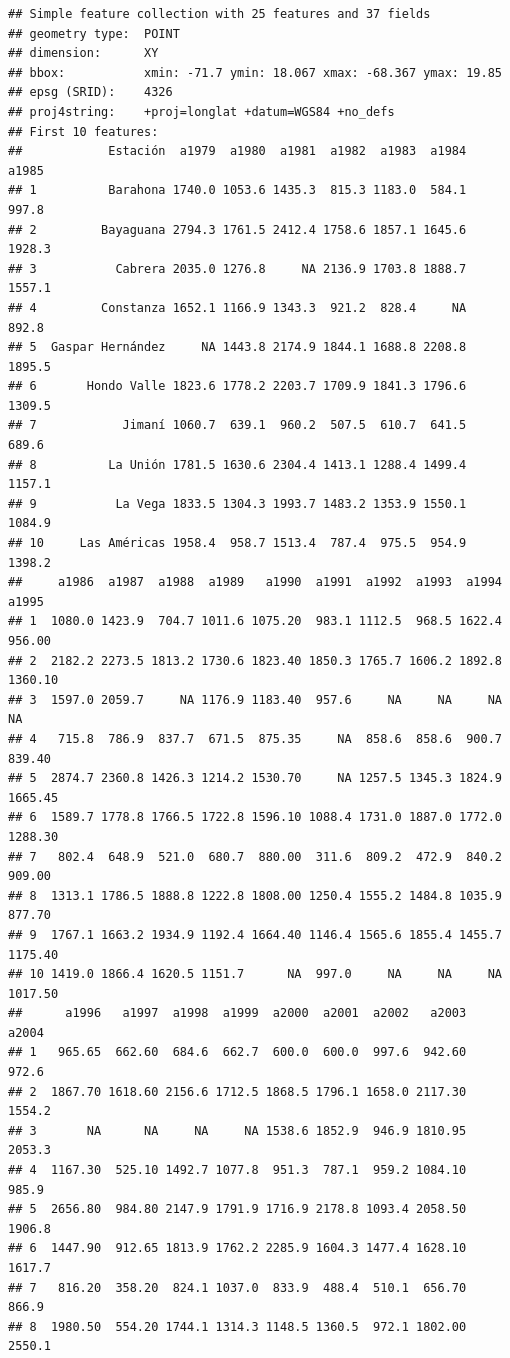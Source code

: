 \documentclass[11pt,]{article}
\begin{document}
\begin{verbatim}
## Simple feature collection with 25 features and 37 fields
## geometry type:  POINT
## dimension:      XY
## bbox:           xmin: -71.7 ymin: 18.067 xmax: -68.367 ymax: 19.85
## epsg (SRID):    4326
## proj4string:    +proj=longlat +datum=WGS84 +no_defs
## First 10 features:
##            Estación  a1979  a1980  a1981  a1982  a1983  a1984  a1985
## 1          Barahona 1740.0 1053.6 1435.3  815.3 1183.0  584.1  997.8
## 2         Bayaguana 2794.3 1761.5 2412.4 1758.6 1857.1 1645.6 1928.3
## 3           Cabrera 2035.0 1276.8     NA 2136.9 1703.8 1888.7 1557.1
## 4         Constanza 1652.1 1166.9 1343.3  921.2  828.4     NA  892.8
## 5  Gaspar Hernández     NA 1443.8 2174.9 1844.1 1688.8 2208.8 1895.5
## 6       Hondo Valle 1823.6 1778.2 2203.7 1709.9 1841.3 1796.6 1309.5
## 7            Jimaní 1060.7  639.1  960.2  507.5  610.7  641.5  689.6
## 8          La Unión 1781.5 1630.6 2304.4 1413.1 1288.4 1499.4 1157.1
## 9           La Vega 1833.5 1304.3 1993.7 1483.2 1353.9 1550.1 1084.9
## 10     Las Américas 1958.4  958.7 1513.4  787.4  975.5  954.9 1398.2
##     a1986  a1987  a1988  a1989   a1990  a1991  a1992  a1993  a1994   a1995
## 1  1080.0 1423.9  704.7 1011.6 1075.20  983.1 1112.5  968.5 1622.4  956.00
## 2  2182.2 2273.5 1813.2 1730.6 1823.40 1850.3 1765.7 1606.2 1892.8 1360.10
## 3  1597.0 2059.7     NA 1176.9 1183.40  957.6     NA     NA     NA      NA
## 4   715.8  786.9  837.7  671.5  875.35     NA  858.6  858.6  900.7  839.40
## 5  2874.7 2360.8 1426.3 1214.2 1530.70     NA 1257.5 1345.3 1824.9 1665.45
## 6  1589.7 1778.8 1766.5 1722.8 1596.10 1088.4 1731.0 1887.0 1772.0 1288.30
## 7   802.4  648.9  521.0  680.7  880.00  311.6  809.2  472.9  840.2  909.00
## 8  1313.1 1786.5 1888.8 1222.8 1808.00 1250.4 1555.2 1484.8 1035.9  877.70
## 9  1767.1 1663.2 1934.9 1192.4 1664.40 1146.4 1565.6 1855.4 1455.7 1175.40
## 10 1419.0 1866.4 1620.5 1151.7      NA  997.0     NA     NA     NA 1017.50
##      a1996   a1997  a1998  a1999  a2000  a2001  a2002   a2003  a2004
## 1   965.65  662.60  684.6  662.7  600.0  600.0  997.6  942.60  972.6
## 2  1867.70 1618.60 2156.6 1712.5 1868.5 1796.1 1658.0 2117.30 1554.2
## 3       NA      NA     NA     NA 1538.6 1852.9  946.9 1810.95 2053.3
## 4  1167.30  525.10 1492.7 1077.8  951.3  787.1  959.2 1084.10  985.9
## 5  2656.80  984.80 2147.9 1791.9 1716.9 2178.8 1093.4 2058.50 1906.8
## 6  1447.90  912.65 1813.9 1762.2 2285.9 1604.3 1477.4 1628.10 1617.7
## 7   816.20  358.20  824.1 1037.0  833.9  488.4  510.1  656.70  866.9
## 8  1980.50  554.20 1744.1 1314.3 1148.5 1360.5  972.1 1802.00 2550.1

\end{verbatim}
\end{document}
